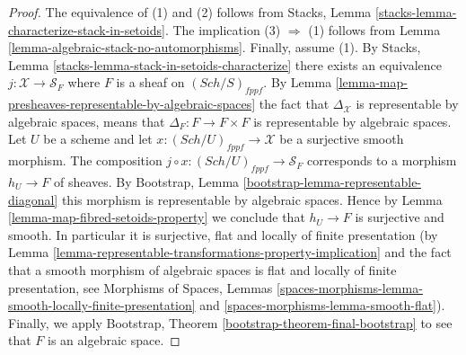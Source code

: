 \documentclass{stacks-project}
\theoremstyle{plain}
\theoremstyle{definition}
\theoremstyle{remark}
\numberwithin{equation}{subsection}
\def\Sch{\mathit{Sch}}
\begin{document}
\begin{proof}
The equivalence of (1) and (2) follows from
Stacks, Lemma \ref{stacks-lemma-characterize-stack-in-setoids}.
The implication (3) $\Rightarrow$ (1) follows from
Lemma \ref{lemma-algebraic-stack-no-automorphisms}.
Finally, assume (1). By
Stacks, Lemma \ref{stacks-lemma-stack-in-setoids-characterize}
there exists an equivalence $j : \mathcal{X} \to \mathcal{S}_F$
where $F$ is a sheaf on $(\Sch/S)_{fppf}$.  By
Lemma \ref{lemma-map-presheaves-representable-by-algebraic-spaces}
the fact that $\Delta_\mathcal{X}$ is representable by algebraic
spaces, means that $\Delta_F : F \to F \times F$
is representable by algebraic spaces.
Let $U$ be a scheme and let $x : (\Sch/U)_{fppf} \to \mathcal{X}$
be a surjective smooth morphism. The composition
$j \circ x : (\Sch/U)_{fppf} \to \mathcal{S}_F$
corresponds to a morphism $h_U \to F$ of sheaves. By
Bootstrap, Lemma \ref{bootstrap-lemma-representable-diagonal}
this morphism is representable by algebraic spaces.
Hence by
Lemma \ref{lemma-map-fibred-setoids-property}
we conclude that $h_U \to F$ is surjective and smooth.
In particular it is surjective, flat and locally of finite presentation
(by
Lemma \ref{lemma-representable-transformations-property-implication}
and the fact that a smooth morphism of algebraic spaces is flat and
locally of finite presentation, see
Morphisms of Spaces,
Lemmas \ref{spaces-morphisms-lemma-smooth-locally-finite-presentation} and
\ref{spaces-morphisms-lemma-smooth-flat}).
Finally, we apply
Bootstrap, Theorem \ref{bootstrap-theorem-final-bootstrap}
to see that $F$ is an algebraic space.
\end{proof}
\end{document}
